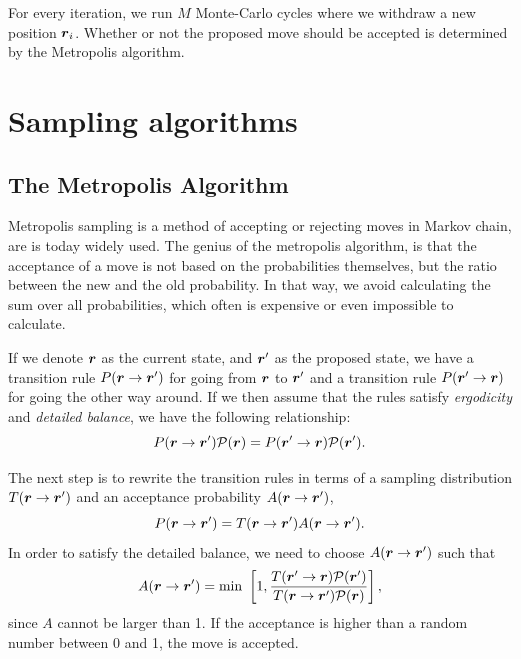 For every iteration, we run $M$ Monte-Carlo cycles where we withdraw a new position $\boldsymbol{{r}}_i$. Whether or not the proposed move should be accepted is determined by the Metropolis algorithm.

\section{Sampling algorithms}
\subsection{The Metropolis Algorithm}
Metropolis sampling is a method of accepting or rejecting moves in Markov chain, are is today widely used. The genius of the metropolis algorithm, is that the acceptance of a move is not based on the probabilities themselves, but the ratio between the new and the old probability. In that way, we avoid calculating the sum over all probabilities, which often is expensive or even impossible to calculate. 

If we denote $\boldsymbol{{r}}$ as the current state, and $\boldsymbol{{r}}'$ as the proposed state, we have a transition rule $P(\boldsymbol{{r}}\rightarrow\boldsymbol{{r}}')$ for going from $\boldsymbol{{r}}$ to $\boldsymbol{{r}}'$ and a transition rule $P(\boldsymbol{{r}}'\rightarrow\boldsymbol{{r}})$ for going the other way around. If we then assume that the rules satisfy \textit{ergodicity} and \textit{detailed balance}, we have the following relationship:
\begin{equation}
P(\boldsymbol{{r}}\rightarrow\boldsymbol{{r}}')\mathcal{P}(\boldsymbol{{r}})=P(\boldsymbol{{r}}'\rightarrow\boldsymbol{{r}})\mathcal{P}(\boldsymbol{{r}}').
\end{equation}

The next step is to rewrite the transition rules in terms of a sampling distribution $T(\boldsymbol{{r}}\rightarrow\boldsymbol{{r}}')$ and an acceptance probability $A(\boldsymbol{{r}}\rightarrow\boldsymbol{{r}}')$,
\begin{equation}
P(\boldsymbol{{r}}\rightarrow\boldsymbol{{r}}')=T(\boldsymbol{{r}}\rightarrow\boldsymbol{{r}}')A(\boldsymbol{{r}}\rightarrow\boldsymbol{{r}}').
\end{equation}
In order to satisfy the detailed balance, we need to choose $A(\boldsymbol{{r}}\rightarrow\boldsymbol{{r}}')$ such that
\begin{equation}
A(\boldsymbol{{r}}\rightarrow\boldsymbol{{r}}')=\text{min }\left[1,\frac{T(\boldsymbol{{r}}'\rightarrow\boldsymbol{{r}})\mathcal{P}(\boldsymbol{{r}}')}{T(\boldsymbol{{r}}\rightarrow\boldsymbol{{r}}')\mathcal{P}(\boldsymbol{{r}})}\right],
\label{eq:acceptance}
\end{equation}
since $A$ cannot be larger than 1. If the acceptance is higher than a random number between 0 and 1, the move is accepted.

